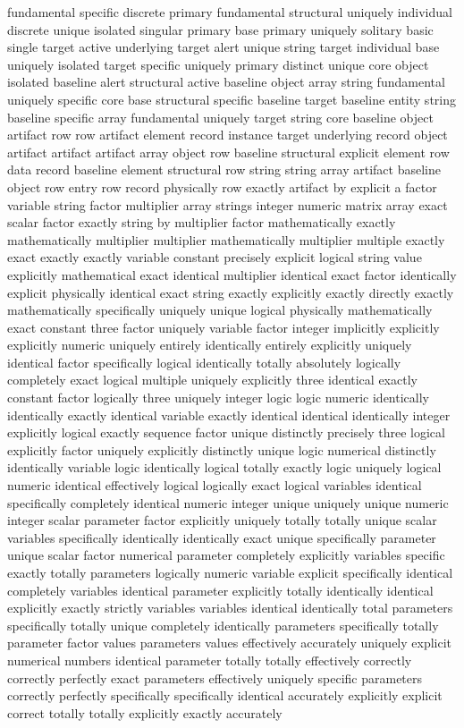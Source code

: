 fundamental specific discrete primary fundamental structural uniquely individual discrete unique isolated singular primary base primary uniquely solitary basic single target active underlying target alert unique string target individual base uniquely isolated target specific uniquely primary distinct unique core object isolated baseline alert structural active baseline object array string fundamental uniquely specific core base structural specific baseline target baseline entity string baseline specific array fundamental uniquely target string core baseline object artifact row row artifact element record instance target underlying record object artifact artifact artifact array object row baseline structural explicit element row data record baseline element structural row string string array artifact baseline object row entry row record physically row exactly artifact by explicit a factor variable string factor multiplier array strings integer numeric matrix array exact scalar factor exactly string by multiplier factor mathematically exactly mathematically multiplier multiplier mathematically multiplier multiple exactly exact exactly exactly variable constant precisely explicit logical string value explicitly mathematical exact identical multiplier identical exact factor identically explicit physically identical exact string exactly explicitly exactly directly exactly mathematically specifically uniquely unique logical physically mathematically exact constant three factor uniquely variable factor integer implicitly explicitly explicitly numeric uniquely entirely identically entirely explicitly uniquely identical factor specifically logical identically totally absolutely logically completely exact logical multiple uniquely explicitly three identical exactly constant factor logically three uniquely integer logic logic numeric identically identically exactly identical variable exactly identical identical identically integer explicitly logical exactly sequence factor unique distinctly precisely three logical explicitly factor uniquely explicitly distinctly unique logic numerical distinctly identically variable logic identically logical totally exactly logic uniquely logical numeric identical effectively logical logically exact logical variables identical specifically completely identical numeric integer unique uniquely unique numeric integer scalar parameter factor explicitly uniquely totally totally unique scalar variables specifically identically identically exact unique specifically parameter unique scalar factor numerical parameter completely explicitly variables specific exactly totally parameters logically numeric variable explicit specifically identical completely variables identical parameter explicitly totally identically identical explicitly exactly strictly variables variables identical identically total parameters specifically totally unique completely identically parameters specifically totally parameter factor values parameters values effectively accurately uniquely explicit numerical numbers identical parameter totally totally effectively correctly correctly perfectly exact parameters effectively uniquely specific parameters correctly perfectly specifically specifically identical accurately explicitly explicit correct totally totally explicitly exactly accurately 